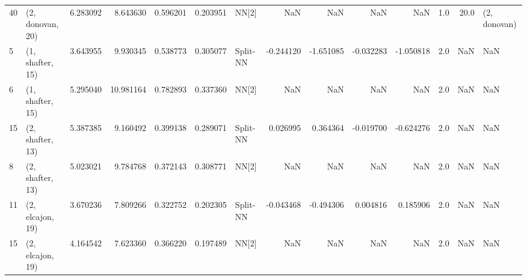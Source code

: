 \begin{tabular}{llrrrrlrrrrrrl}
40 &  (2, donovan, 20) &  6.283092 &   8.643630 &   0.596201 &  0.203951 &       NN[2] &             NaN &           NaN &            NaN &          NaN &            1.0 &   20.0 &     (2, donovan) \\
5  &  (1, shafter, 15) &  3.643955 &   9.930345 &   0.538773 &  0.305077 &    Split-NN &       -0.244120 &     -1.651085 &      -0.032283 &    -1.050818 &            2.0 &    NaN &              NaN \\
6  &  (1, shafter, 15) &  5.295040 &  10.981164 &   0.782893 &  0.337360 &       NN[2] &             NaN &           NaN &            NaN &          NaN &            2.0 &    NaN &              NaN \\
15 &  (2, shafter, 13) &  5.387385 &   9.160492 &   0.399138 &  0.289071 &    Split-NN &        0.026995 &      0.364364 &      -0.019700 &    -0.624276 &            2.0 &    NaN &              NaN \\
8  &  (2, shafter, 13) &  5.023021 &   9.784768 &   0.372143 &  0.308771 &       NN[2] &             NaN &           NaN &            NaN &          NaN &            2.0 &    NaN &              NaN \\
11 &  (2, elcajon, 19) &  3.670236 &   7.809266 &   0.322752 &  0.202305 &    Split-NN &       -0.043468 &     -0.494306 &       0.004816 &     0.185906 &            2.0 &    NaN &              NaN \\
15 &  (2, elcajon, 19) &  4.164542 &   7.623360 &   0.366220 &  0.197489 &       NN[2] &             NaN &           NaN &            NaN &          NaN &            2.0 &    NaN &              NaN \\
\bottomrule
\end{tabular}
